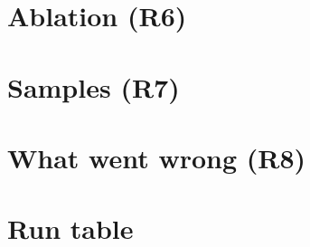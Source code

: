 \documentclass[11pt,a4paper]{article}
\begin{document}
\section{Ablation (R6)}

\section{Samples (R7)}

\section{What went wrong (R8)}

\appendix
\section{Run table}
\end{document}
